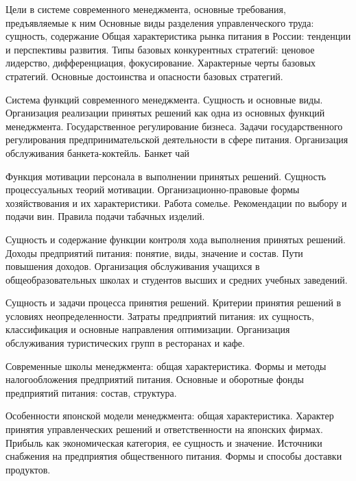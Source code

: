 \documentclass[
	11pt,
	a4paper,
	]
	{article}
\begin{document}
\bigskip

\noindent{} 
	{
		Цели в системе современного менеджмента, основные требования, предъявляемые к ним Основные виды разделения управленческого труда: сущность, содержание
	}{
		Общая характеристика рынка питания в России: тенденции и перспективы развития.
	}{
		Типы базовых конкурентных стратегий: ценовое лидерство, дифференциация, фокусирование. Характерные черты базовых стратегий. Основные достоинства и опасности базовых стратегий.
	}

\bigskip

\noindent{} 
	{
		Система функций современного менеджмента. Сущность и основные виды. Организация реализации принятых решений как одна из основных функций менеджмента.
	}{
		Государственное регулирование бизнеса. Задачи государственного регулирования предпринимательской деятельности в сфере питания.
	}{
		Организация обслуживания банкета-коктейль. Банкет чай
	}

\bigskip

\noindent{} 
	{
		Функция мотивации персонала в выполнении принятых решений. Сущность процессуальных теорий мотивации.
	}{
		Организационно-правовые формы хозяйствования и их характеристики.
	}{
		Работа сомелье. Рекомендации по выбору и подачи вин. Правила подачи табачных изделий.
	}

\bigskip

\noindent{} 
	{
		Сущность и содержание функции контроля хода выполнения принятых решений.
	}{
		Доходы предприятий питания: понятие, виды, значение и состав. Пути повышения доходов.
	}{
		Организация обслуживания учащихся в общеобразовательных школах и студентов высших и средних учебных заведений.
	}

\bigskip

\noindent{} 
	{
		Сущность и задачи процесса принятия решений. Критерии принятия решений в условиях неопределенности.
	}{
		Затраты предприятий питания: их сущность, классификация и основные направления оптимизации.
	}{
		Организация обслуживания туристических групп в ресторанах и кафе.
	}

\bigskip

\noindent{} 
	{
		Современные школы менеджмента: общая характеристика.
	}{
		Формы и методы налогообложения предприятий питания.
	}{
		Основные и оборотные фонды предприятий питания: состав, структура.
	}

\bigskip

\noindent{} 
	{
		Особенности японской модели менеджмента: общая характеристика. Характер принятия управленческих решений и ответственности на японских фирмах.
	}{
		Прибыль как экономическая категория, ее сущность и значение.
	}{
		Источники снабжения на предприятия общественного питания. Формы и способы доставки продуктов.
	}
\end{document}
